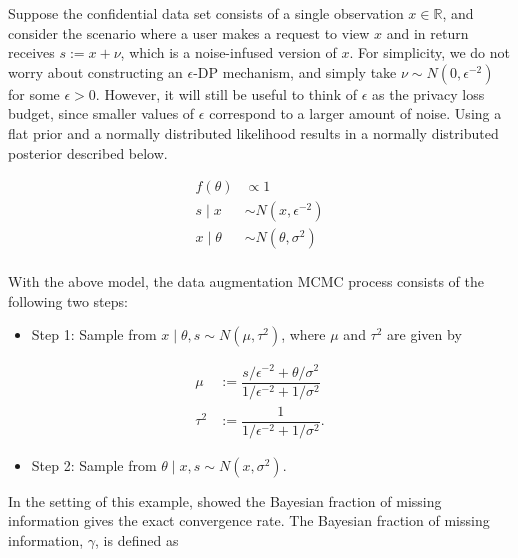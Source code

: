 Suppose the confidential data set consists of a single observation \(x \in \mathbb{R}\),
and consider the scenario where a user makes a request to view \(x\) and
in return receives \(s := x + \nu\), which is a noise-infused version of \(x\).
For simplicity, we do not worry about constructing an \(\epsilon\)-DP mechanism,
and simply take \(\nu \sim N(0, \epsilon^{-2})\) for some \(\epsilon > 0\). However, it
will still be useful to think of \(\epsilon\) as the privacy loss budget, since smaller values
of \(\epsilon\) correspond to a larger amount of noise. Using
a flat prior and a normally distributed likelihood results in
a normally distributed posterior described below.

\begin{equation*}
\begin{aligned}
f(\theta) &\propto 1\\
s \mid x &\sim N(x, \epsilon^{-2})\\
x \mid \theta &\sim N(\theta, \sigma^2)\\
\end{aligned}
\end{equation*}

With the above model, the data augmentation MCMC process consists of the following
two steps:

\begin{itemize}
\tightlist
\item
  Step 1: Sample from \(x \mid \theta, s \sim N(\mu, \tau^2)\), where
  \(\mu\) and \(\tau^2\) are given by
\end{itemize}

\begin{equation*}
  \begin{aligned}
  \mu &:= \dfrac{s/\epsilon^{-2} + \theta/\sigma^2}{1/\epsilon^{-2} + 1/\sigma^2}\\
  \tau^2 &:= \dfrac{1}{1/\epsilon^{-2} + 1/\sigma^2}.
  \end{aligned}
  \end{equation*}

\begin{itemize}
\tightlist
\item
  Step 2: Sample from \(\theta \mid x, s  \sim N(x, \sigma^2)\).
\end{itemize}

In the setting of this example, \citet{Liu1999} showed the Bayesian fraction of missing information
gives the exact convergence rate. The Bayesian fraction of missing information, \(\gamma\), is
defined as

